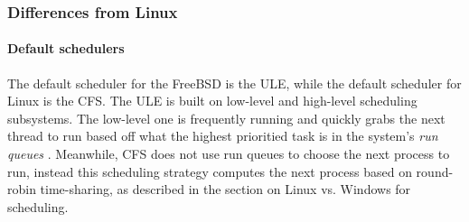 \documentclass[letterpaper,10pt,titlepage]{article}
\begin{document}
\subsubsection{Differences from Linux}
\paragraph{Default schedulers}The default scheduler for the FreeBSD is the ULE, while the default scheduler for Linux is the CFS. The ULE is built on low-level and high-level scheduling subsystems. The low-level one is frequently running and quickly grabs the next thread to run based off what the highest prioritied task is in the system's \emph{run queues} \cite{mck15}. Meanwhile, CFS does not use run queues to choose the next process to run, instead this scheduling strategy computes the next process based on round-robin time-sharing, as described in the section on Linux vs. Windows for scheduling.


\newpage
{}

\end{document}

